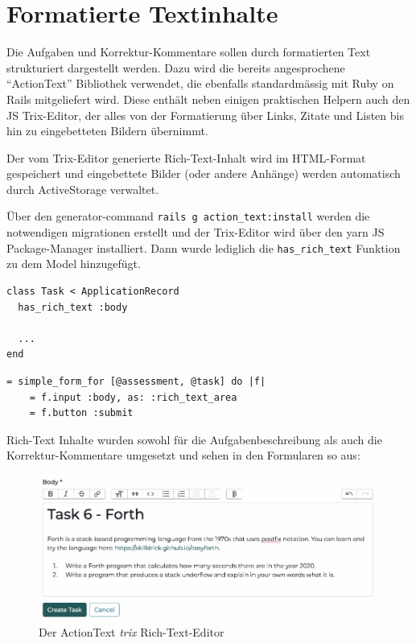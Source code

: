 \section{Formatierte Textinhalte}

Die Aufgaben und Korrektur-Kommentare sollen durch formatierten Text strukturiert dargestellt werden.
Dazu wird die bereits angesprochene \enquote{ActionText} Bibliothek verwendet, die ebenfalls standardmässig mit Ruby on Rails mitgeliefert wird.
Diese enthält neben einigen praktischen Helpern auch den JS Trix-Editor, der alles von der Formatierung über Links, Zitate und Listen bis hin zu eingebetteten Bildern übernimmt. 

Der vom Trix-Editor generierte Rich-Text-Inhalt wird im HTML-Format gespeichert und eingebettete Bilder (oder andere Anhänge) werden automatisch durch ActiveStorage verwaltet.

Über den generator-command \texttt{rails g action_text:install} werden die notwendigen migrationen erstellt und
der Trix-Editor wird über den yarn JS Package-Manager installiert. Dann wurde lediglich die \texttt{has_rich_text} Funktion
zu dem Model hinzugefügt. 

\begin{codebox}
\begin{verbatim}
class Task < ApplicationRecord
  has_rich_text :body
  
  ...
end
\end{verbatim}
\end{codebox}

\begin{codebox}
\begin{verbatim}
= simple_form_for [@assessment, @task] do |f|
    = f.input :body, as: :rich_text_area
    = f.button :submit
\end{verbatim}
\end{codebox}

Rich-Text Inhalte wurden sowohl für die Aufgabenbeschreibung als auch die Korrektur-Kommentare umgesetzt und sehen
in den Formularen so aus:

\begin{figure}[H]
  \centering
  \includegraphics[width=14cm]{images/trix.png}
  \caption{Der ActionText \emph{trix} Rich-Text-Editor}
\end{figure}

